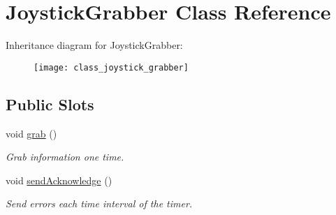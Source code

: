 \hypertarget{class_joystick_grabber}{\section{Joystick\-Grabber Class Reference}
\label{class_joystick_grabber}
}
Inheritance diagram for Joystick\-Grabber\-:\begin{figure}[H]
\begin{center}
\leavevmode
\texttt{[image: class\_joystick\_grabber]}
\end{center}
\end{figure}
\subsection*{Public Slots}
\begin{DoxyCompactItemize}
\item 
void \hyperlink{class_joystick_grabber_a30ed6804623b6513422a42f2ae95c046}{grab} ()
\begin{DoxyCompactList}\small\item\em Grab information one time. \end{DoxyCompactList}\item 
void \hyperlink{class_joystick_grabber_ae880b3d96fd4d528df1b03fe7de4667f}{send\-Acknowledge} ()
\begin{DoxyCompactList}\small\item\em Send errors each time interval of the timer. \end{DoxyCompactList}\end{DoxyCompactItemize}
